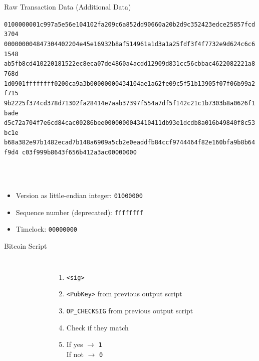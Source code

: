 \documentclass[]{beamer}
\begin{document}
\begin{frame}{Raw Transaction Data (Additional Data)}
\begin{scriptsize}
\texttt{\alert<2>{01000000}\textcolor{black!30}{01c997a5e56e104102fa209c6a852dd90660a20b2d9c352423edce25857fcd3704
000000004847304402204e45e16932b8af514961a1d3a1a25fdf3f4f7732e9d624c6c61548
ab5fb8cd410220181522ec8eca07de4860a4acdd12909d831cc56cbbac4622082221a8768d
1d0901}\alert<3>{ffffffff}\textcolor{black!30}{0200ca9a3b00000000434104ae1a62fe09c5f51b13905f07f06b99a2f715
9b2225f374cd378d71302fa28414e7aab37397f554a7df5f142c21c1b7303b8a0626f1bade
d5c72a704f7e6cd84cac00286bee0000000043410411db93e1dcdb8a016b49840f8c53bc1e
b68a382e97b1482ecad7b148a6909a5cb2e0eaddfb84ccf9744464f82e160bfa9b8b64f9d4
c03f999b8643f656b412a3ac}\alert<4>{00000000}}
\vspace{1em}
\end{scriptsize}
\scriptsize \\
\\
\begin{itemize}
	\item \alert<2>{Version as little-endian integer: \texttt{01000000}}
	\item \alert<3>{Sequence number (deprecated): \texttt{ffffffff}}
	\item \alert<4>{Timelock: \texttt{00000000}}
\end{itemize}
\end{frame}

\begin{frame}{Bitcoin Script}
\begin{columns}
\begin{figure}
	
\end{figure}

\begin{enumerate}
\item<1-> \texttt{<sig>}
\item<2-> \texttt{<PubKey>} from previous output script
\item<3-> \texttt{OP\_CHECKSIG} from previous output script
\item<4-> Check if they match
\item<5-> If yes $\rightarrow$ \texttt{1} \\ If not $\rightarrow$ \texttt{0} 
\end{enumerate}

\end{columns}
\end{frame}
\end{document}
